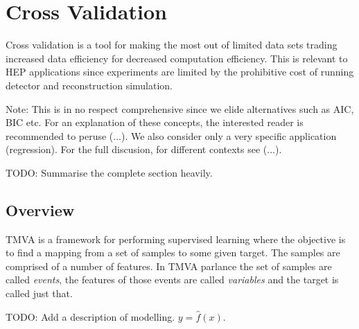 

%
%
%
%
%


\section{Cross Validation}
Cross validation is a tool for making the most out of limited data
sets trading increased data efficiency for decreased computation efficiency.
This is relevant to HEP applications since experiments are limited by the
prohibitive cost of running detector and reconstruction simulation.

Note: This is in no respect comprehensive since we elide alternatives such as
AIC, BIC etc. For an explanation of these concepts, the interested reader is
recommended to peruse (...).
We also consider only a very specific application (regression). For the full
discusion, for different contexts see (...).

TODO: Summarise the complete section heavily.

\subsection{Overview}
TMVA is a framework for performing supervised learning where the objective is to find a mapping from a set of samples to some given target. The samples are comprised of a number of features. In TMVA parlance the set of samples are called \emph{events}, the features of those events are called \emph{variables} and the target is called just that.

TODO: Add a description of modelling. $y = \hat{f}(x)$.


